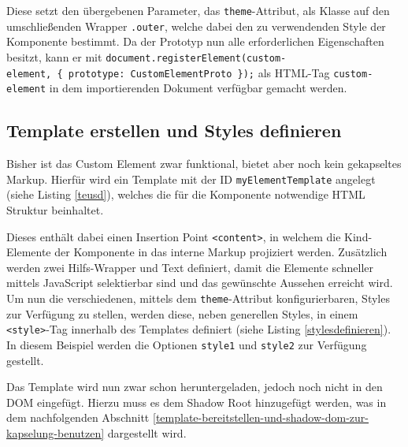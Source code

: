 

Diese setzt den übergebenen Parameter, das \texttt{theme}-Attribut, als Klasse auf den umschließenden Wrapper \texttt{.outer}, welche dabei den zu verwendenden Style der Komponente bestimmt. Da der Prototyp nun alle erforderlichen Eigenschaften besitzt, kann er mit \texttt{document.registerElement(\dq custom-element\dq,\ \{\ prototype:\ CustomElementProto\ \});} als \ac{HTML}-Tag \texttt{custom-element} in dem importierenden Dokument verfügbar gemacht werden.


\subsection{Template erstellen und Styles definieren}\label{template-erstellen-und-styles-definieren}

Bisher ist das Custom Element zwar funktional, bietet aber noch kein gekapseltes Markup. Hierfür wird ein Template mit der ID \texttt{myElementTemplate} angelegt (siehe Listing \ref{teusd}), welches die für die Komponente notwendige \ac{HTML} Struktur beinhaltet.



Dieses enthält dabei einen Insertion Point \texttt{\textless{}content\textgreater{}}, in welchem die Kind-Elemente der Komponente in das interne Markup projiziert werden. Zusätzlich werden zwei Hilfs-Wrapper und Text definiert, damit die Elemente schneller mittels JavaScript selektierbar sind und das gewünschte Aussehen erreicht wird. Um nun die verschiedenen, mittels dem \texttt{theme}-Attribut konfigurierbaren, Styles zur Verfügung zu stellen, werden diese, neben generellen Styles, in einem \texttt{\textless{}style\textgreater{}}-Tag innerhalb des Templates definiert (siehe Listing \ref{stylesdefinieren}). In diesem Beispiel werden die Optionen \texttt{style1} und \texttt{style2} zur Verfügung gestellt.



Das Template wird nun zwar schon heruntergeladen, jedoch noch nicht in den \ac{DOM} eingefügt. Hierzu muss es dem Shadow Root hinzugefügt werden, was in dem nachfolgenden Abschnitt \ref{template-bereitstellen-und-shadow-dom-zur-kapselung-benutzen} dargestellt wird.


